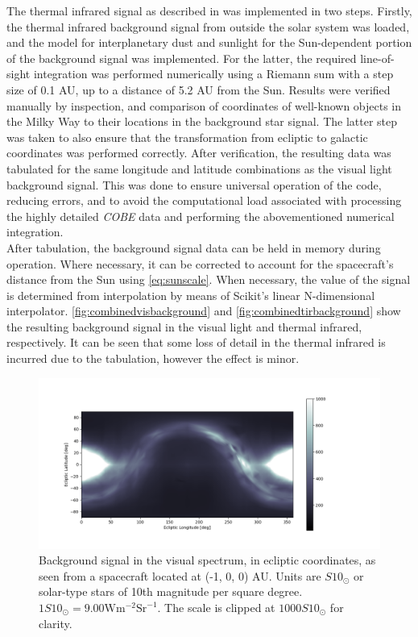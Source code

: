 The thermal infrared signal as described in \cite{IRDust} was implemented in two steps. Firstly, the thermal infrared background signal from outside the solar system was loaded, and the model for interplanetary dust and sunlight for the Sun-dependent portion of the background signal was implemented. For the latter, the required line-of-sight integration was performed numerically using a Riemann sum with a step size of 0.1 AU, up to a distance of 5.2 AU from the Sun. Results were verified manually by inspection, and comparison of coordinates of well-known objects in the Milky Way to their locations in the background star signal. The latter step was taken to also ensure that the transformation from ecliptic to galactic coordinates was performed correctly. After verification, the resulting data was tabulated for the same longitude and latitude combinations as the visual light background signal. This was done to ensure universal operation of the code, reducing errors, and to avoid the computational load associated with processing the highly detailed \textit{COBE} data and performing the abovementioned numerical integration. \\

After tabulation, the background signal data can be held in memory during operation. Where necessary, it can be corrected to account for the spacecraft's distance from the Sun using \autoref{eq:sunscale}. When necessary, the value of the signal is determined from interpolation by means of Scikit's linear N-dimensional interpolator. \autoref{fig:combinedvisbackground} and \autoref{fig:combinedtirbackground} show the resulting background signal in the visual light and thermal infrared, respectively. It can be seen that some loss of detail in the thermal infrared is incurred due to the tabulation, however the effect is minor.

\begin{figure}[htbp]
 \centering
 \includegraphics[width=1.0\textwidth]{img/background_vis_combined.png}
 \caption{Background signal in the visual spectrum, in ecliptic coordinates, as seen from a spacecraft located at (-1, 0, 0) AU. Units are $S10_\odot$ or solar-type stars of 10th magnitude per square degree. $1S10_\odot = 9.00\mathrm{W}\mathrm{m}^{-2}\mathrm{Sr}^{-1}$. The scale is clipped at $1000 S10_\odot$ for clarity.}
 \label{fig:combinedvisbackground}
\end{figure}

